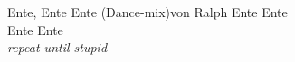 
\begin{lied**}{Ente, Ente Ente (Dance-mix)}{von Ralph}
Ente Ente\\
Ente Ente\\
\textit{repeat until stupid}\\
\end{lied**}
